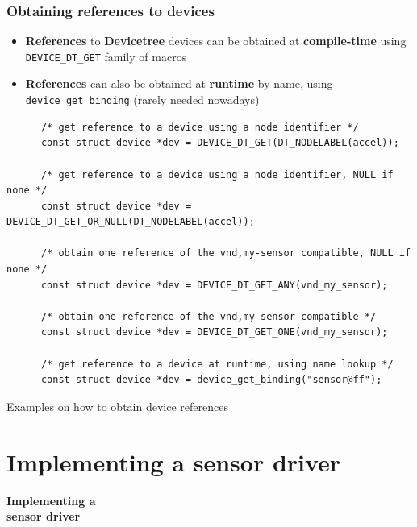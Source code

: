 \documentclass[handout]{beamer}
\begin{document}
\begin{frame}[fragile]
  \frametitle{Obtaining references to devices}

  \begin{itemize}
    \item \textbf{References} to \textbf{Devicetree} devices can be obtained
          at \textbf{compile-time} using \texttt{DEVICE\_DT\_GET} family of
          macros
    \item \textbf{References} can also be obtained at \textbf{runtime} by
          name, using \texttt{device\_get\_binding} (rarely needed nowadays)
  \end{itemize}

  \begin{listing}[H]
    \begin{verbatim}
      /* get reference to a device using a node identifier */
      const struct device *dev = DEVICE_DT_GET(DT_NODELABEL(accel));

      /* get reference to a device using a node identifier, NULL if none */
      const struct device *dev = DEVICE_DT_GET_OR_NULL(DT_NODELABEL(accel));

      /* obtain one reference of the vnd,my-sensor compatible, NULL if none */
      const struct device *dev = DEVICE_DT_GET_ANY(vnd_my_sensor);

      /* obtain one reference of the vnd,my-sensor compatible */
      const struct device *dev = DEVICE_DT_GET_ONE(vnd_my_sensor);
  
      /* get reference to a device at runtime, using name lookup */
      const struct device *dev = device_get_binding("sensor@ff");
    \end{verbatim}
    \caption{Examples on how to obtain device references}
  \end{listing}
\end{frame}


\section{Implementing a sensor driver}

\begin{frame}
  \begin{center}
    \Huge \textbf{Implementing a\\sensor driver}
  \end{center}
\end{frame}
\end{document}
